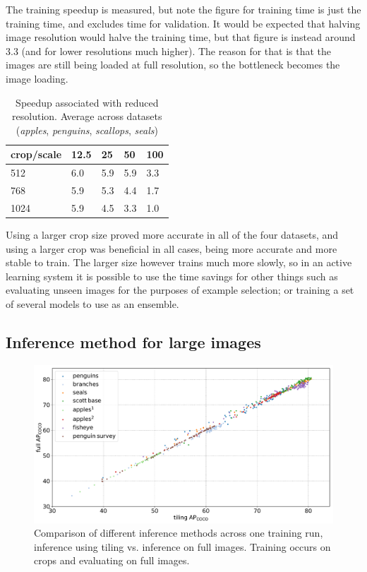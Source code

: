The training speedup is measured, but note the figure for training time is just the training time, and excludes time for validation. It would be expected that halving image resolution would halve the training time, but that figure is instead around $3.3$ (and for lower resolutions much higher). The reason for that is that the images are still being loaded at full resolution, so the bottleneck becomes the image loading.

\begin{table}[ht]
  \centering
    \caption{Speedup associated with reduced resolution. Average across datasets (\emph{apples}, \emph{penguins}, \emph{scallops}, \emph{seals})  }
  \begin{tabular}{ l | l l l l}
    crop/scale & 12.5 & 25 & 50 & 100 \\
    \toprule
        512   & 6.0  & 5.9  &  5.9  & 3.3 \\
        768   & 5.9 & 5.3  &  4.4 &  1.7 \\
        1024  & 5.9 & 4.5  &  3.3  & 1.0 \\
    \bottomrule
  \end{tabular}
\label{tab:speed_scale_crop}
\end{table}


Using a larger crop size proved more accurate in all of the four datasets, and using a larger crop was beneficial in all cases, being more accurate and more stable to train. The larger size however trains much more slowly, so in an active learning system it is possible to use the time savings for other things such as evaluating unseen images for the purposes of example selection; or training a set of several models to use as an ensemble.


\subsection {Inference method for large images}

\begin{figure}[h] 
  \centering
  \includegraphics[width=1.0\linewidth]{charts/training/splits_scatters.pdf}
  \caption{Comparison of different inference methods across one training run, inference using tiling vs. inference on full images. Training occurs on crops and evaluating on full images. }   
  \label{fig:inference_method}
\end{figure}


